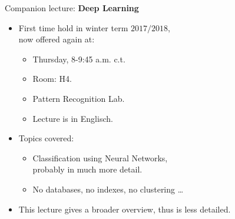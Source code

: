 \documentclass[aspectratio=169,t]{beamer}
\begin{document}
  { %
    \begin{frame}{Companion lecture: \textbf{Deep Learning}}
      \begin{itemize}
          \item First time hold in winter term $2017/2018$,\\
                now offered again at:
                \begin{itemize}
                    \item Thursday, 8-9:45 a.m. c.t.
                    \item Room: H4.
                    \item Pattern Recognition Lab.
                    \item Lecture is in Englisch.
                \end{itemize}
          \item Topics covered:
                \begin{itemize}
                    \item Classification using Neural Networks, \\
                          probably in much more detail.
                    \item No databases, no indexes, no clustering \ldots
                \end{itemize}
          \item This lecture gives a broader overview, thus is less detailed.
      \end{itemize}
    \end{frame}
  }
\end{document}
